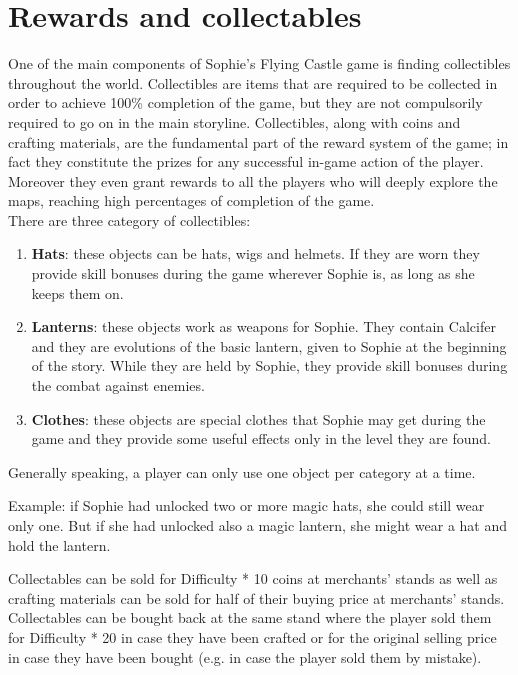\section{Rewards and collectables}
One of the main components of Sophie's Flying Castle game is finding collectibles throughout the world.
Collectibles are items that are required to be collected in order to achieve 100\%
completion of the game, but they are not compulsorily required to go on in the main storyline. Collectibles, along with coins and crafting materials, are the fundamental part of the reward system of the game; in fact they constitute the prizes for any successful in-game action of the player. Moreover they even grant rewards to all the players who will deeply explore the maps, reaching high percentages of completion of the game.\\

There are three category of collectibles:
\begin{enumerate}
\item \textbf{Hats}: these objects can be hats, wigs and helmets. If they are worn they provide skill bonuses during the game wherever Sophie is, as long as she keeps them on.
\item \textbf{Lanterns}: these objects work as weapons for Sophie. They contain Calcifer and they are evolutions of the basic lantern, given to Sophie at the beginning of the story. While they are held by Sophie, they provide skill bonuses during the combat against enemies. 
\item \textbf{Clothes}: these objects are special clothes that Sophie may get during the game and they provide some useful effects only in the level they are found. %
  \end{enumerate}

Generally speaking, a player can only use one object per category at a time.

Example: if Sophie had unlocked two or more magic hats, she could still wear only one. But if she had unlocked also a magic lantern, she might wear a hat and hold the lantern.

Collectables can be sold for Difficulty * 10 coins at merchants' stands as well as crafting materials can be sold for half of their buying price at merchants' stands. Collectables can be bought back at the same stand where the player sold them for Difficulty * 20 in case they have been crafted or for the original selling price in case they have been bought (e.g. in case the player sold them by mistake).



